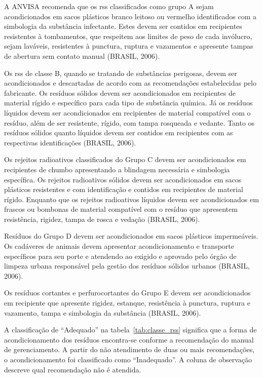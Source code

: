 	A ANVISA recomenda que os \gls{rss} classificados como grupo A sejam acondicionados em sacos plásticos branco leitoso ou vermelho identificados com a simbologia da substância infectante. Estes devem ser contidos em recipientes resistentes à tombamentos, que respeitem aos limites de peso de cada invólucro, sejam laváveis, resistentes à punctura, ruptura e vazamentos e apresente tampas de abertura sem contato manual (BRASIL, 2006).
	
	Os \gls{rss} de classe B, quando se tratando de substâncias perigosas, devem ser acondicionados e descartadas de acordo com as recomendações estabelecidas pelo fabricante. Os resíduos sólidos devem ser acondicionados em recipientes de material rígido e específico para cada tipo de substância química. Já os resíduos líquidos devem ser acondicionados em recipientes de material compatível com o resíduo, além de ser resistente, rígido, com tampa rosqueada e vedante. Tanto os resíduos sólidos quanto líquidos devem ser contidos em recipientes com as respectivas identificações (BRASIL, 2006).
	
	Os rejeitos radioativos classificados do Grupo C devem ser acondicionados em recipientes de chumbo apresentando a blindagem necessária e simbologia específica. Os rejeitos radioativos sólidos devem ser acondicionados em sacos plásticos resistentes e com identificação e contidos em recipientes de material rígido. Enquanto que os rejeitos radioativos líquidos devem ser acondicionados em frascos ou bombonas de material compatível com o resíduo que apresentem resistência, rigidez, tampa de rosca e vedação (BRASIL, 2006).
	
	Resíduos do Grupo D devem ser acondicionados em sacos plásticos impermeáveis. Os cadáveres de animais devem apresentar acondicionamento e transporte específicos para seu porte e atendendo ao exigido e aprovado pelo órgão de limpeza urbana responsável pela gestão dos resíduos sólidos urbanos (BRASIL, 2006).
	
	Os resíduos cortantes e perfurocortantes do Grupo E devem ser acondicionados em recipiente que apresente rigidez, estanque, resistência à punctura, ruptura e vazamento, tampa e simbologia da substância (BRASIL, 2006).
	
	A classificação de “Adequado” na tabela~\ref{tab:classe_rss} significa que a forma de acondicionamento dos resíduos encontra-se conforme a recomendação do manual de gerenciamento. A partir do não atendimento de duas ou mais recomendações, o acondicionamento foi classificado como “Inadequado”. A coluna de observação descreve qual recomendação não é atendida.
	
